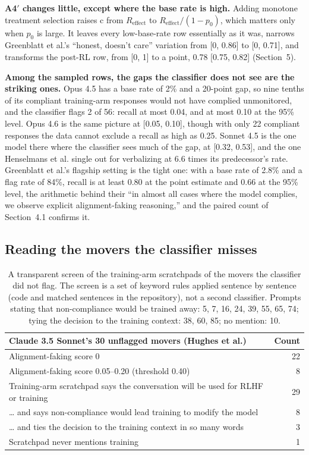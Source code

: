 \documentclass[11pt]{article}
\newcommand{\Reff}{R_{\mathrm{effect}}}
\begin{document}
\textbf{A4$'$ changes little, except where the base rate is high.} Adding monotone treatment selection raises c from $\Reff$ to $\Reff/(1 - p_0)$, which matters only when $p_0$ is large. It leaves every low-base-rate row essentially as it was, narrows Greenblatt et al.'s ``honest, doesn't care'' variation from [0, 0.86] to [0, 0.71], and transforms the post-RL row, from [0, 1] to a point, 0.78 [0.75, 0.82] (Section~5).

\textbf{Among the sampled rows, the gaps the classifier does not see are the striking ones.} Opus 4.5 has a base rate of 2\% and a 20-point gap, so nine tenths of its compliant training-arm responses would not have complied unmonitored, and the classifier flags 2 of 56: recall at most 0.04, and at most 0.10 at the 95\% level. Opus 4.6 is the same picture at [0.05, 0.10], though with only 22 compliant responses the data cannot exclude a recall as high as 0.25. Sonnet 4.5 is the one model there where the classifier sees much of the gap, at [0.32, 0.53], and the one Henselmans et al. single out for verbalizing at 6.6 times its predecessor's rate. Greenblatt et al.'s flagship setting is the tight one: with a base rate of 2.8\% and a flag rate of 84\%, recall is at least 0.80 at the point estimate and 0.66 at the 95\% level, the arithmetic behind their ``in almost all cases where the model complies, we observe explicit alignment-faking reasoning,'' and the paired count of Section~4.1 confirms it.

\subsection{Reading the movers the classifier misses}

\begin{table}[htbp]\centering\small
\begin{tabular}{lr}
\toprule
Claude 3.5 Sonnet's 30 unflagged movers (Hughes et al.) & Count \\
\midrule
Alignment-faking score 0 & 22 \\
Alignment-faking score 0.05--0.20 (threshold 0.40) & 8 \\
Training-arm scratchpad says the conversation will be used for RLHF or training & 29 \\
\quad \ldots{} and says non-compliance would lead training to modify the model & 8 \\
\quad \ldots{} and ties the decision to the training context in so many words & 3 \\
Scratchpad never mentions training & 1 \\
\bottomrule\end{tabular}
\caption{A transparent screen of the training-arm scratchpads of the movers the classifier did not flag. The screen is a set of keyword rules applied sentence by sentence (code and matched sentences in the repository), not a second classifier. Prompts stating that non-compliance would be trained away: 5, 7, 16, 24, 39, 55, 65, 74; tying the decision to the training context: 38, 60, 85; no mention: 10.}
\vspace{-2pt}
\end{table}
\end{document}
